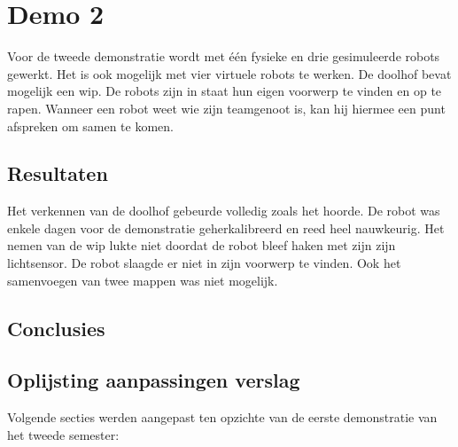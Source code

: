 \documentclass[tt3]{penoverslag}
\begin{document}

\section{Demo 2}
\label{Asec:demo2}
Voor de tweede demonstratie wordt met \'e\'en fysieke en drie gesimuleerde robots gewerkt. Het is ook mogelijk met vier virtuele robots te werken. De doolhof bevat mogelijk een wip. De robots zijn in staat hun eigen voorwerp te vinden en op te rapen. Wanneer een robot weet wie zijn teamgenoot is, kan hij hiermee een punt afspreken om samen te komen.\\

\subsection{Resultaten}
\label{Assec:result2}
Het verkennen van de doolhof gebeurde volledig zoals het hoorde. De robot was enkele dagen voor de demonstratie geherkalibreerd en reed heel nauwkeurig. Het nemen van de wip lukte niet doordat de robot bleef haken met zijn zijn lichtsensor.
De robot slaagde er niet in zijn voorwerp te vinden. Ook het samenvoegen van twee mappen was niet mogelijk.

\subsection{Conclusies}
\label{Assec:conc2}


\subsection{Oplijsting aanpassingen verslag}
\label{Assec:aanp2}
Volgende secties werden aangepast ten opzichte van de eerste demonstratie van het tweede semester:
\end{document}
